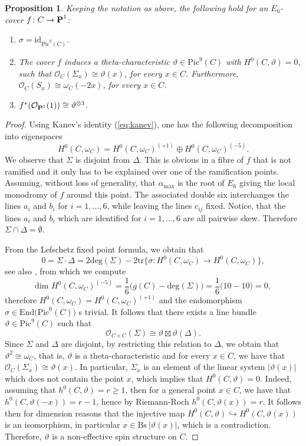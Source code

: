 \documentclass[11pt]{amsart}
\newtheorem{proposition}[theorem]{Proposition}
\theoremstyle{definition}
\def\PP{{\textbf P}}
\def\OO{\mathcal{O}}
\begin{document}
\begin{proposition}\label{prop:corresp1}
Keeping the notation as above, the following hold for an $E_6$-cover $f\colon C\rightarrow \PP^1$:
\begin{enumerate}
    \item $\sigma=\mathrm{id}_{\mathrm{Pic}^0(C)}.$
    \item The cover $f$ induces a theta-characteristic $\vartheta\in \mathrm{Pic}^9(C)$ with $H^0(C, \vartheta)=0$, such that  $\OO_C(\Sigma_x)\cong \vartheta(x)$,  for every $x\in C$. Furthermore, $\OO_C(S_x)\cong \omega_C(-2x)$, for every $x\in C$.
    \item $f^*(\OO_{\PP^1}(1))\cong \vartheta^{\otimes 3}$.
\end{enumerate}
\end{proposition}
\begin{proof}
Using Kanev's identity (\ref{eq:kanev}), one has the following decomposition into eigenspaces 
$$H^0(C,\omega_C)=H^0(C,\omega_C)^{(+1)}\oplus H^0(C,\omega_C)^{(-5)}.$$ 
We observe that $\Sigma$ is disjoint from $\Delta$. This is obvious in a fibre of $f$ that is not ramified and it only has to be explained over one of the ramification points. Assuming, without loss of generality, that $\alpha_{\mathrm{max}}$ is the root of $E_6$ giving the local monodromy of $f$ around this point. The associated double six interchanges the lines $a_i$ and $b_i$ for $i=1, \ldots, 6$, while leaving the lines $c_{ij}$ fixed. Notice, that the lines $a_i$ and $b_i$ which are identified for $i=1, \ldots, 6$ are all pairwise skew. Therefore $\Sigma\cap \Delta=\emptyset$.
\vskip 3pt

From the Lefschetz fixed point formula, we obtain that 
$$0=\Sigma\cdot \Delta=2\mbox{deg}(\Sigma)-2\mbox{tr}\bigl\{\sigma\colon H^0(C,\omega_C)\longrightarrow H^0(C,\omega_C)\bigr\},$$
see also \cite[1.10]{ADFIO}, from which we compute 
$$\mbox{dim } H^0(C,\omega_C)^{(-5)}=\frac{1}{6}\bigl(g(C)-\mbox{deg}(\Sigma)\bigr)=\frac{1}{6}\bigl(10-10\bigr)=0,$$
therefore $H^0(C,\omega_C)=H^0(C,\omega_C)^{(+1)}$ and the endomorphism $\sigma\in \mbox{End}\bigl(\mbox{Pic}^0(C)\bigr)$ s trivial. It follows that there exists a line bundle $\vartheta\in \mbox{Pic}^9(C)$ such that 
$$\OO_{C\times C}(\Sigma)\cong \vartheta\boxtimes \vartheta(\Delta).$$
Since $\Sigma$ and $\Delta$ are disjoint, by restricting this relation to $\Delta$, we obtain that $\vartheta^{2}\cong \omega_C$, that is, $\vartheta$ is a theta-characteristic and for every $x\in C$, we have that $\OO_C(\Sigma_x)\cong \vartheta(x)$. In particular, $\Sigma_x$ is an  element of the linear system $|\vartheta(x)|$ which does not contain the point $x$, which implies that $H^0(C,\vartheta)=0$. Indeed, assuming that $h^0(C,\vartheta)=r\geq 1$, then for a general point $x\in C$, we have that 
$h^0(C,\vartheta(-x))=r-1$, hence by Riemann-Roch $h^0(C,\vartheta(x))=r$. It follows then for dimension reasons that the injective map $H^0(C,\vartheta)\hookrightarrow H^0(C,\vartheta(x))$ is an isomorphism, in particular $x\in \mathrm{Bs}\ |\vartheta(x)|$, which is a contradiction. Therefore, $\vartheta$ is a non-effective spin structure on $C$.



\end{proof}
\end{document}
